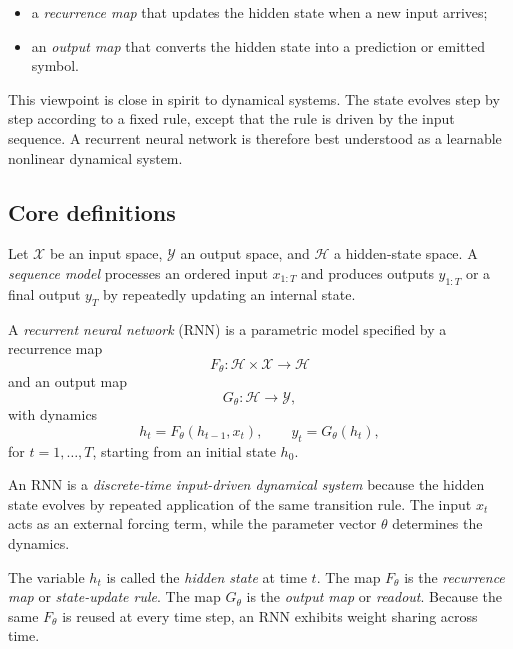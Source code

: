 \begin{itemize}
    \item a \emph{recurrence map} that updates the hidden state when a new input arrives;
    \item an \emph{output map} that converts the hidden state into a prediction or emitted symbol.
\end{itemize}

This viewpoint is close in spirit to dynamical systems.
The state evolves step by step according to a fixed rule, except that the rule is driven by the input sequence.
A recurrent neural network is therefore best understood as a learnable nonlinear dynamical system.

\subsection*{Core definitions}

\begin{definition}
Let $\mathcal{X}$ be an input space, $\mathcal{Y}$ an output space, and $\mathcal{H}$ a hidden-state space.
A \emph{sequence model} processes an ordered input $x_{1:T}$ and produces outputs $y_{1:T}$ or a final output $y_T$ by repeatedly updating an internal state.
\end{definition}

\begin{definition}
A \emph{recurrent neural network} (RNN) is a parametric model specified by a recurrence map
\[
F_\theta : \mathcal{H} \times \mathcal{X} \to \mathcal{H}
\]
and an output map
\[
G_\theta : \mathcal{H} \to \mathcal{Y},
\]
with dynamics
\[
 h_t = F_\theta(h_{t-1},x_t),
 \qquad
 y_t = G_\theta(h_t),
\]
for $t=1,\dots,T$, starting from an initial state $h_0$.
\end{definition}

\begin{definition}
An RNN is a \emph{discrete-time input-driven dynamical system} because the hidden state evolves by repeated application of the same transition rule.
The input $x_t$ acts as an external forcing term, while the parameter vector $\theta$ determines the dynamics.
\end{definition}

\begin{definition}
The variable $h_t$ is called the \emph{hidden state} at time $t$.
The map $F_\theta$ is the \emph{recurrence map} or \emph{state-update rule}.
The map $G_\theta$ is the \emph{output map} or \emph{readout}.
Because the same $F_\theta$ is reused at every time step, an RNN exhibits weight sharing across time.
\end{definition}

